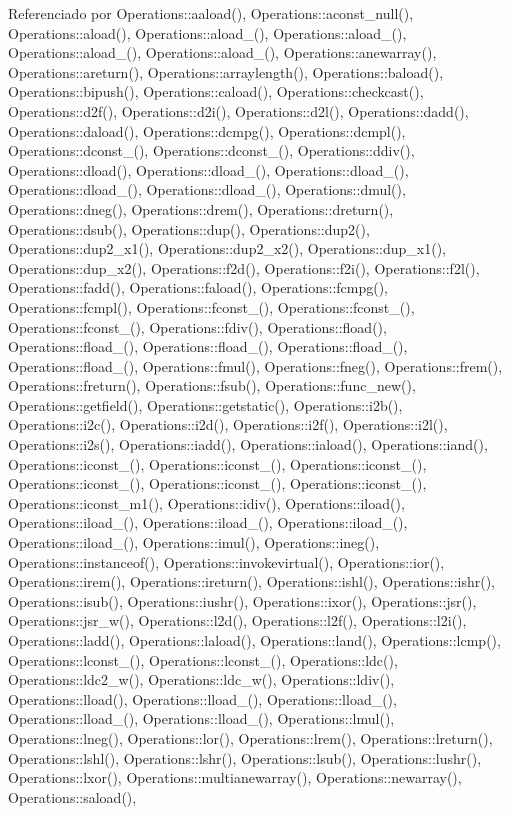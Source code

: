 Referenciado por Operations\+::aaload(), Operations\+::aconst\+\_\+null(), Operations\+::aload(), Operations\+::aload\+\_(), Operations\+::aload\+\_(), Operations\+::aload\+\_(), Operations\+::aload\+\_(), Operations\+::anewarray(), Operations\+::areturn(), Operations\+::arraylength(), Operations\+::baload(), Operations\+::bipush(), Operations\+::caload(), Operations\+::checkcast(), Operations\+::d2f(), Operations\+::d2i(), Operations\+::d2l(), Operations\+::dadd(), Operations\+::daload(), Operations\+::dcmpg(), Operations\+::dcmpl(), Operations\+::dconst\+\_(), Operations\+::dconst\+\_(), Operations\+::ddiv(), Operations\+::dload(), Operations\+::dload\+\_(), Operations\+::dload\+\_(), Operations\+::dload\+\_(), Operations\+::dload\+\_(), Operations\+::dmul(), Operations\+::dneg(), Operations\+::drem(), Operations\+::dreturn(), Operations\+::dsub(), Operations\+::dup(), Operations\+::dup2(), Operations\+::dup2\+\_\+x1(), Operations\+::dup2\+\_\+x2(), Operations\+::dup\+\_\+x1(), Operations\+::dup\+\_\+x2(), Operations\+::f2d(), Operations\+::f2i(), Operations\+::f2l(), Operations\+::fadd(), Operations\+::faload(), Operations\+::fcmpg(), Operations\+::fcmpl(), Operations\+::fconst\+\_(), Operations\+::fconst\+\_(), Operations\+::fconst\+\_(), Operations\+::fdiv(), Operations\+::fload(), Operations\+::fload\+\_(), Operations\+::fload\+\_(), Operations\+::fload\+\_(), Operations\+::fload\+\_(), Operations\+::fmul(), Operations\+::fneg(), Operations\+::frem(), Operations\+::freturn(), Operations\+::fsub(), Operations\+::func\+\_\+new(), Operations\+::getfield(), Operations\+::getstatic(), Operations\+::i2b(), Operations\+::i2c(), Operations\+::i2d(), Operations\+::i2f(), Operations\+::i2l(), Operations\+::i2s(), Operations\+::iadd(), Operations\+::iaload(), Operations\+::iand(), Operations\+::iconst\+\_(), Operations\+::iconst\+\_(), Operations\+::iconst\+\_(), Operations\+::iconst\+\_(), Operations\+::iconst\+\_(), Operations\+::iconst\+\_(), Operations\+::iconst\+\_\+m1(), Operations\+::idiv(), Operations\+::iload(), Operations\+::iload\+\_(), Operations\+::iload\+\_(), Operations\+::iload\+\_(), Operations\+::iload\+\_(), Operations\+::imul(), Operations\+::ineg(), Operations\+::instanceof(), Operations\+::invokevirtual(), Operations\+::ior(), Operations\+::irem(), Operations\+::ireturn(), Operations\+::ishl(), Operations\+::ishr(), Operations\+::isub(), Operations\+::iushr(), Operations\+::ixor(), Operations\+::jsr(), Operations\+::jsr\+\_\+w(), Operations\+::l2d(), Operations\+::l2f(), Operations\+::l2i(), Operations\+::ladd(), Operations\+::laload(), Operations\+::land(), Operations\+::lcmp(), Operations\+::lconst\+\_(), Operations\+::lconst\+\_(), Operations\+::ldc(), Operations\+::ldc2\+\_\+w(), Operations\+::ldc\+\_\+w(), Operations\+::ldiv(), Operations\+::lload(), Operations\+::lload\+\_(), Operations\+::lload\+\_(), Operations\+::lload\+\_(), Operations\+::lload\+\_(), Operations\+::lmul(), Operations\+::lneg(), Operations\+::lor(), Operations\+::lrem(), Operations\+::lreturn(), Operations\+::lshl(), Operations\+::lshr(), Operations\+::lsub(), Operations\+::lushr(), Operations\+::lxor(), Operations\+::multianewarray(), Operations\+::newarray(), Operations\+::saload(), 